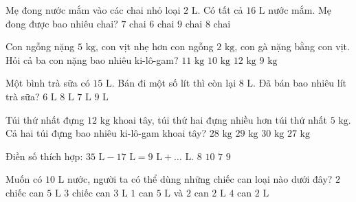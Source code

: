 \begin{ex} %
Mẹ đong nước mắm vào các chai nhỏ loại $2\text{ L}$. Có tất cả $16\text{ L}$ nước mắm. Mẹ đong được bao nhiêu chai?
\choice
{$7$ chai}
{$6$ chai}
{$9$ chai}
{\True $8$ chai}
\end{ex}

\begin{ex} %
Con ngỗng nặng $5\text{ kg}$, con vịt nhẹ hơn con ngỗng $2\text{ kg}$, con gà nặng bằng con vịt. Hỏi cả ba con nặng bao nhiêu ki-lô-gam?
\choice
{\True $11\text{ kg}$}
{$10\text{ kg}$}
{$12\text{ kg}$}
{$9\text{ kg}$}
\end{ex}

\begin{ex} %
Một bình trà sữa có $15\text{ L}$. Bán đi một số lít thì còn lại $8\text{ L}$. Đã bán bao nhiêu lít trà sữa?
\choice
{$6\text{ L}$}
{$8\text{ L}$}
{\True $7\text{ L}$}
{$9\text{ L}$}
\end{ex}

\begin{ex} %
Túi thứ nhất đựng $12\text{ kg}$ khoai tây, túi thứ hai đựng nhiều hơn túi thứ nhất $5\text{ kg}$. Cả hai túi đựng bao nhiêu ki-lô-gam khoai tây?
\choice
{$28\text{ kg}$}
{\True $29\text{ kg}$}
{$30\text{ kg}$}
{$27\text{ kg}$}
\end{ex}

\begin{ex} %
Điền số thích hợp: $35\text{ L} - 17\text{ L} = 9\text{ L} + \dots\text{ L}$.
\choice
{$8$}
{$10$}
{$7$}
{\True $9$}
\end{ex}

\begin{ex} %
Muốn có $10\text{ L}$ nước, người ta có thể dùng những chiếc can loại nào dưới đây?
\choice
{\True $2$ chiếc can $5\text{ L}$}
{$3$ chiếc can $3\text{ L}$}
{$1$ can $5\text{ L}$ và $2$ can $2\text{ L}$}
{$4$ can $2\text{ L}$}
\end{ex}

